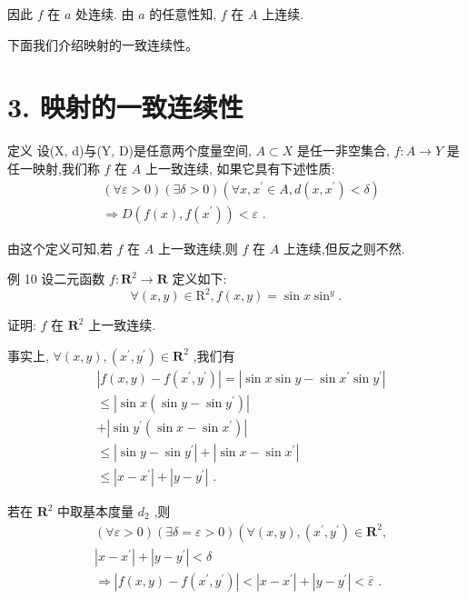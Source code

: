 因此 $f$ 在 $a$ 处连续. 由 $a$ 的任意性知, $f$ 在 $A$ 上连续.

下面我们介绍映射的一致连续性。

\section*{3. 映射的一致连续性}

定义 设(X, d)与(Y, D)是任意两个度量空间, $A \subset  X$ 是任一非空集合, $f : A \rightarrow  Y$ 是任一映射,我们称 $f$ 在 $A$ 上一致连续, 如果它具有下述性质:
\begin{align*}
	&\left( {\forall \varepsilon  > 0}\right) \left( {\exists \delta  > 0}\right) \left( {\forall x,{x}^{\prime } \in  A,d\left( {x,{x}^{\prime }}\right)  < \delta }\right)\\
	&\Rightarrow  D\left( {f\left( x\right) ,f\left( {x}^{\prime }\right) }\right)  < \varepsilon \text{ . }
\end{align*}

由这个定义可知,若 $f$ 在 $A$ 上一致连续,则 $f$ 在 $A$ 上连续,但反之则不然.

例 10 设二元函数 $f : {\mathbf{R}}^{2} \rightarrow  \mathbf{R}$ 定义如下:
$$\forall \left( {x,y}\right)  \in  {\mathrm{R}}^{2},f\left( {x,y}\right)  = \sin x{\sin }^{y}.$$

证明: $f$ 在 ${\mathbf{R}}^{2}$ 上一致连续.

事实上, $\forall \left( {x,y}\right) ,\left( {{x}^{\prime },{y}^{\prime }}\right)  \in  {\mathbf{R}}^{2}$ ,我们有
\begin{align*}
	&\left| {f\left( {x,y}\right)  - f\left( {{x}^{\prime },{y}^{\prime }}\right) }\right|  = \left| {\sin x\sin y - \sin {x}^{\prime }\sin {y}^{\prime }}\right|\\
	&\leq  \left| {\sin x\left( {\sin y - \sin {y}^{\prime }}\right) }\right|\\
	&+ \left| {\sin {y}^{\prime }\left( {\sin x - \sin {x}^{\prime }}\right) }\right|\\
	&\leq  \left| {\sin y - \sin {y}^{\prime }}\right|  + \left| {\sin x - \sin {x}^{\prime }}\right|\\
	&\leq  \left| {x - {x}^{\prime }}\right|  + \left| {y - {y}^{\prime }}\right| \text{ . }
\end{align*}

若在 ${\mathbf{R}}^{2}$ 中取基本度量 ${d}_{2}$ ,则
\begin{align*}
	&\left( {\forall \varepsilon  > 0}\right) \left( {\exists \delta  = \varepsilon  > 0}\right) \left( {\forall \left( {x,y}\right) ,\left( {{x}^{\prime },{y}^{\prime }}\right)  \in  {\mathbf{R}}^{2},}\right.\\
	&\left| {x - {x}^{\prime }}\right|  + \left| {y - {y}^{\prime }}\right|  < \delta\\
	&\Rightarrow  \left| {f\left( {x,y}\right)  - f\left( {{x}^{\prime },{y}^{\prime }}\right) }\right|  < \left| {x - {x}^{\prime }}\right|  + \left| {y - {y}^{\prime }}\right|  < \bar{\varepsilon }\text{ . }
\end{align*}

